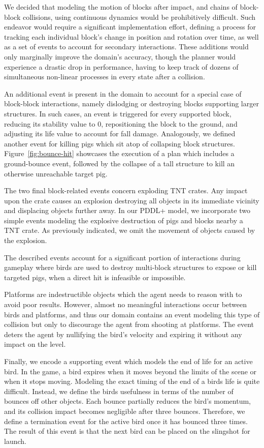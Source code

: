 We decided that modeling the motion of blocks after impact, and chains of block-block collisions, using continuous dynamics would be prohibitively difficult. Such endeavor would require a significant implementation effort, defining a process for tracking each individual block's change in position and rotation over time, as well as a set of events to account for secondary interactions. These additions would only marginally improve the domain's accuracy, though the planner would experience a drastic drop in performance, having to keep track of dozens of simultaneous non-linear processes in every state after a collision.

An additional event is present in the domain to account for a special case of block-block interactions, namely dislodging or destroying blocks supporting larger structures. In such cases, an event is triggered for every supported block, reducing its stability value to 0, repositioning the block to the ground, and adjusting its life value to account for fall damage. Analogously, we defined another event for killing pigs which sit atop of collapsing block structures. Figure~\ref{fig:bounce-hit} showcases the execution of a plan which includes a ground-bounce event, followed by the collapse of a tall structure to kill an otherwise unreachable target pig.

The two final block-related events concern exploding TNT crates. Any impact upon the crate causes an explosion destroying all objects in its immediate vicinity and displacing objects further away. In our PDDL+ model, we incorporate two simple events modeling the explosive destruction of pigs and blocks nearby a TNT crate. As previously indicated, we omit the movement of objects caused by the explosion. 

The described events account for a significant portion of interactions during gameplay where birds are used to destroy multi-block structures to expose or kill targeted pigs, when a direct hit is infeasible or impossible.

Platforms are indestructible objects which the agent needs to reason with to avoid poor results. However, almost no meaningful interactions occur between birds and platforms, and thus our domain contains an event modeling this type of collision but only to discourage the agent from shooting at platforms. The event deters the agent by nullifying the bird's velocity and expiring it without any impact on the level.

Finally, we encode a supporting event which models the end of life for an active bird. In the game, a bird expires when it moves beyond the limits of the scene or when it stops moving. Modeling the exact timing of the end of a birds life is quite difficult. Instead, we define the birds usefulness in terms of the number of bounces off other objects. Each bounce partially reduces the bird's momentum, and its collision impact becomes negligible after three bounces. Therefore, we define a termination event for the active bird once it has bounced three times. The result of this event is that the next bird can be placed on the slingshot for launch.


